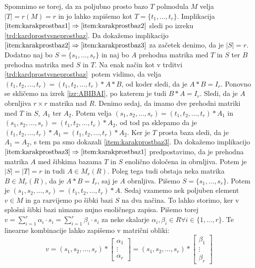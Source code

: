 \documentclass[mat1]{fmfdelo}
\newcommand{\abs}[1]{\ensuremath{\lvert #1 \rvert}}
\begin{document}
\begin{dokaz}
Spomnimo se torej, da za poljubno prosto bazo $T$ polmodula $M$ velja $\abs{T} = r(M) = r$ in jo lahko zapišemo kot $T = \{t_1, \ldots, t_r\}$. Implikacija $\ref{item:karakprostbaz1}\Rightarrow \ref{item:karakprostbaz2}$ sledi po izreku \ref{trd:kardprostvsneprostbaz}. Da dokažemo implikacijo $\ref{item:karakprostbaz2}\Rightarrow \ref{item:karakprostbaz3}$ za začetek denimo, da je $\abs{S} = r$. Dodatno naj bo $S = \{s_1, \ldots, s_r\}$ in naj bo $A$ prehodna matrika med $T$ in $S$ ter $B$ prehodna matrika med $S$ in $T$. Na enak način kot v trditvi \ref{trd:kardprostvsneprostbaz}~potem vidimo, da velja $(t_1, t_2, \ldots, t_r) = (t_1, t_2, \ldots, t_r)*A*B$, od koder sledi, da je $A*B = I_r$. Ponovno se skličemo na izrek \ref{izr:ABIBAI}, po katerem je tudi $B*A = I_r$. Sledi, da je $A$ obrnljiva $r\times r$ matrika nad $R$. Denimo sedaj, da imamo dve prehodni matriki med $T$ in $S$, $A_1$ ter $A_2$. Potem velja $(s_1, s_2, \ldots, s_r) = (t_1, t_2, \ldots, t_r)*A_1$ in $(s_1, s_2, \ldots, s_r) = (t_1, t_2, \ldots, t_r)*A_2$, od tod pa sklepamo da je $(t_1, t_2, \ldots, t_r)*A_1 = (t_1, t_2, \ldots, t_r)*A_2$. Ker je $T$ prosta baza sledi, da je $A_1 = A_2$, s tem pa smo dokazali \ref{item:karakprostbaz3}. Da dokažemo implikacijo $\ref{item:karakprostbaz3}\Rightarrow \ref{item:karakprostbaz1}$ predpostavimo, da je prehodna matrika $A$ med šibkima bazama $T$ in $S$ enolično določena in obrnljiva. Potem je $\abs{S} = \abs{T} = r$ in tudi $A\in M_r(R)$. Poleg tega tudi obstaja neka matrika $B\in M_r(R)$, da je $A*B =I_r$, saj je $A$ obrnljiva. Pišemo $S = \{s_1,\ldots,s_r\}$. Potem je $(s_1, s_2, \ldots, s_r) = (t_1, t_2, \ldots, t_r)*A$. Sedaj vzamemo nek poljuben element $v\in M$ in ga razvijemo po šibki bazi $S$ na dva načina. To lahko storimo, ker v splošni šibki bazi nimamo nujno enoličnega zapisa. Pišemo torej $v = \sum_{i = 1}^{r}\alpha_i\cdot s_i = \sum_{i = 1}^{r} \beta_i \cdot s_i$ za neke skalarje $\alpha_i, \beta_i \in R \forall i\in \{1, \ldots, r\}$. Te linearne kombinacije lahko zapišemo v matrični obliki: $$ v = (s_1, s_2, \ldots, s_r)*\begin{bmatrix}
	\alpha_1 \\
	\vdots \\
	\alpha_r 
\end{bmatrix} = (s_1, s_2, \ldots, s_r)*\begin{bmatrix}
\beta_1 \\
\vdots \\
\beta_r 
\end{bmatrix}$$

\end{dokaz}
\end{document}
